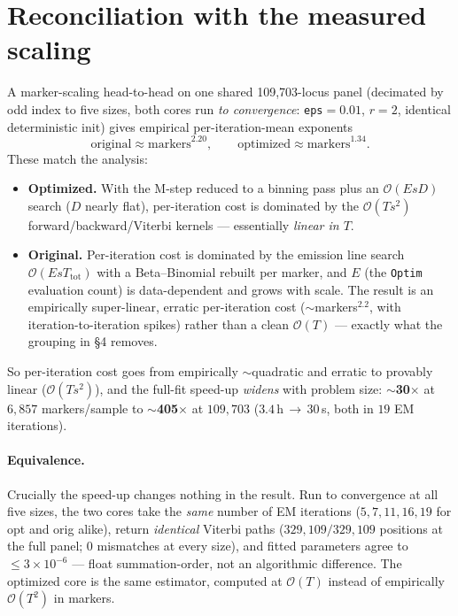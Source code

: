 \documentclass[11pt]{article}
\newcommand{\bigO}{\mathcal{O}}
\newcommand{\code}[1]{\texttt{#1}}
\begin{document}
\section{Reconciliation with the measured scaling}

A marker-scaling head-to-head on one shared 109{,}703-locus panel (decimated by
odd index to five sizes, both cores run \emph{to convergence}: \texttt{eps}$=0.01$,
$r=2$, identical deterministic init) gives empirical per-iteration-mean exponents
\[
\text{original}\approx \text{markers}^{2.20},
\qquad
\text{optimized}\approx \text{markers}^{1.34}.
\]
These match the analysis:
\begin{itemize}[nosep]
\item \textbf{Optimized.} With the M-step reduced to a binning pass plus an
$\bigO(E s D)$ search ($D$ nearly flat), per-iteration cost is dominated by the
$\bigO(T s^2)$ forward/backward/Viterbi kernels --- essentially \emph{linear in
$T$}.
\item \textbf{Original.} Per-iteration cost is dominated by the emission line
search $\bigO(E s T_{\text{tot}})$ with a Beta--Binomial rebuilt per marker, and
$E$ (the \code{Optim} evaluation count) is data-dependent and grows with scale.
The result is an empirically super-linear, erratic per-iteration cost
($\sim$markers$^{2.2}$, with iteration-to-iteration spikes) rather than a clean
$\bigO(T)$ --- exactly what the grouping in \S4 removes.
\end{itemize}
So per-iteration cost goes from empirically $\sim$quadratic and erratic to
provably linear ($\bigO(T s^2)$), and the full-fit speed-up \emph{widens} with
problem size: \textbf{$\sim$30$\times$} at $6{,}857$ markers/sample to
\textbf{$\sim$405$\times$} at $109{,}703$ ($3.4$\,h\,$\to$\,$30$\,s, both in
$19$ EM iterations).

\paragraph{Equivalence.} Crucially the speed-up changes nothing in the result.
Run to convergence at all five sizes, the two cores take the \emph{same} number
of EM iterations ($5,7,11,16,19$ for opt and orig alike), return \emph{identical}
Viterbi paths ($329{,}109/329{,}109$ positions at the full panel; $0$ mismatches
at every size), and fitted parameters agree to $\le 3\times10^{-6}$ --- float
summation-order, not an algorithmic difference. The optimized core is the same
estimator, computed at $\bigO(T)$ instead of empirically $\bigO(T^2)$ in markers.
\end{document}
